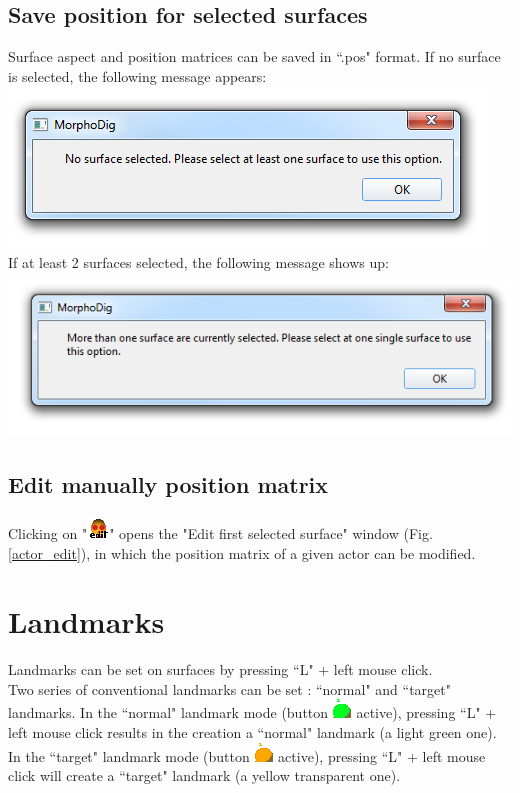\subsection{Save position for selected surfaces}
Surface aspect and position matrices can be saved in ``.pos" format. If no surface is selected, the
following message appears:\\
\includegraphics[scale=0.5]{images/07/position/no_surface_selected.png}
\\
If at least 2 surfaces selected, the following message shows up:\\
\includegraphics[scale=0.5]{images/07/position/at_least_2_surfaces_selected.png}

\subsection{Edit manually position matrix}
Clicking on "\includegraphics[scale=0.7]{images/06/objects/actor_edit.png}" opens the "Edit first selected surface" window (Fig. \ref{actor_edit}), in which the position matrix of a given actor can be modified.



\section{Landmarks}
Landmarks can be set on surfaces by pressing ``L" + left mouse click.\\

Two series of conventional landmarks can be set : ``normal" and ``target" landmarks. In the ``normal" landmark mode (button \includegraphics[scale=0.7]{images/04/normal_landmarks.png} active), pressing ``L" + left mouse click results in the creation a ``normal" landmark (a light green one). In the ``target" landmark mode (button \includegraphics[scale=0.7]{images/04/target_landmarks.png} active),
pressing ``L" + left mouse click will create a ``target" landmark (a yellow transparent one).

